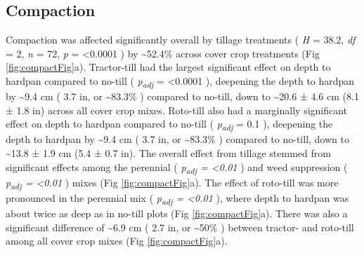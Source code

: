 \documentclass[
  12pt,
]{article}
\begin{document}
\hypertarget{compaction}{%
\subsection{Compaction}\label{compaction}}

Compaction was affected significantly overall by tillage treatments (
\emph{H} = 38.2,
\emph{df} = 2,
\emph{n} = 72,
\emph{p} = \textless0.0001
) by
\textasciitilde52.4\%
across cover crop treatments (Fig \ref{fig:compactFig}a).
Tractor-till had the largest significant effect on depth to hardpan compared to no-till (
\emph{p\textsubscript{adj}} = \textless0.0001
),
deepening the depth to hardpan by
\textasciitilde9.4 cm (
3.7 in,
or \textasciitilde83.3\%
) compared to no-till,
down to
\textasciitilde20.6 ±
4.6 cm
(8.1 ±
1.8 in)
across all cover crop mixes.
Roto-till also had a marginally significant effect on depth to hardpan compared to no-till (
\emph{p\textsubscript{adj}} = 0.1
),
deepening the depth to hardpan by
\textasciitilde9.4 cm (
3.7 in,
or \textasciitilde83.3\%
) compared to no-till, down to
\textasciitilde13.8 ±
1.9 cm
(5.4 ±
0.7 in).
The overall effect from tillage stemmed from significant effects among the perennial (
\emph{p\textsubscript{adj} = \textless0.01}
) and weed suppression (
\emph{p\textsubscript{adj} = \textless0.01}
) mixes (Fig \ref{fig:compactFig}a).
The effect of roto-till was more pronounced in the perennial mix (
\emph{p\textsubscript{adj} = \textless0.01}
), where depth to hardpan was about twice as deep as in no-till plots (Fig \ref{fig:compactFig}a).
There was also a significant difference of
\textasciitilde6.9 cm (
2.7 in,
or \textasciitilde50\%
) between tractor- and roto-till among all cover crop mixes (Fig \ref{fig:compactFig}a).
\end{document}
